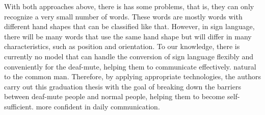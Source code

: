 With both approaches above, there is has some problems, that is, they can only recognize 
a very small number of words. These words are mostly words with different hand shapes 
that can be classified like that. However, in sign language, there will be many words 
that use the same hand shape but will differ in many characteristics, such as position 
and orientation. To our knowledge, there is currently no model that can handle the 
conversion of sign language flexibly and conveniently for the deaf-mute, helping them 
to communicate effectively. natural to the common man. Therefore, by applying appropriate 
technologies, the authors carry out this graduation thesis with the goal of breaking down 
the barriers between deaf-mute people and normal people, helping them to become self-sufficient. 
more confident in daily communication.
